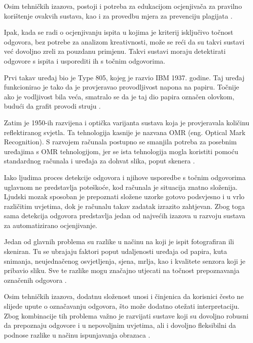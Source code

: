 \documentclass{foi}
\begin{document}
Osim tehničkih izazova, postoji i potreba za edukacijom ocjenjivača za pravilno korištenje ovakvih sustava, kao i za provedbu mjera za prevenciju plagijata \cite{Leonard2025Feb}.

Ipak, kada se radi o ocjenjivanju ispita u kojima je kriterij isključivo točnost odgovora, bez potrebe za analizom kreativnosti, može se reći da su takvi sustavi već dovoljno zreli za pouzdanu primjenu. Takvi sustavi moraju detektirati odgovore s ispita i usporediti ih s točnim odgovorima. 

Prvi takav uređaj bio je Type 805, kojeg je razvio IBM 1937. godine. Taj uređaj funkcionirao je tako da je provjeravao provodljivost napona na papiru. Točnije ako je vodljivost bila veća, smatralo se da je taj dio papira označen olovkom, budući da grafit provodi struju \cite{OMRart}.

Zatim je 1950-ih razvijena i optička varijanta sustava koja je provjeravala količinu reflektiranog svjetla. Ta tehnologija kasnije je nazvana OMR (eng. Optical Mark Recognition). S razvojem računala postupno se smanjila potreba za posebnim uređajima s OMR tehnologijom, jer se ista tehnologija mogla koristiti pomoću standardnog računala i uređaja za dohvat slika, poput skenera \cite{OMRart}.

Iako ljudima proces detekcije odgovora i njihove usporedbe s točnim odgovorima uglavnom ne predstavlja poteškoće, kod računala je situacija znatno složenija. Ljudski mozak sposoban je prepoznati složene uzorke gotovo podsvjesno i u vrlo različitim uvjetima, dok je računalu takav zadatak izrazito zahtjevan. Zbog toga sama detekcija odgovora predstavlja jedan od najvećih izazova u razvoju sustava za automatizirano ocjenjivanje.

Jedan od glavnih problema su razlike u načinu na koji je ispit fotografiran ili skeniran. Tu se ubrajaju faktori poput udaljenosti uređaja od papira, kuta snimanja, neujednačenog osvjetljenja, sjena, mrlja, kao i kvalitete senzora koji je pribavio sliku. Sve te razlike mogu značajno utjecati na točnost prepoznavanja označenih odgovora \cite{OMRart}.

Osim tehničkih izazova, dodatnu složenost unosi i činjenica da korisnici često ne slijede upute o označavanju odgovora, što može dodatno otežati interpretaciju. Zbog kombinacije tih problema važno je razvijati sustave koji su dovoljno robusni da prepoznaju odgovore i u nepovoljnim uvjetima, ali i dovoljno fleksibilni da podnose razlike u načinu ispunjavanja obrazaca \cite{OMRart}.
\end{document}
